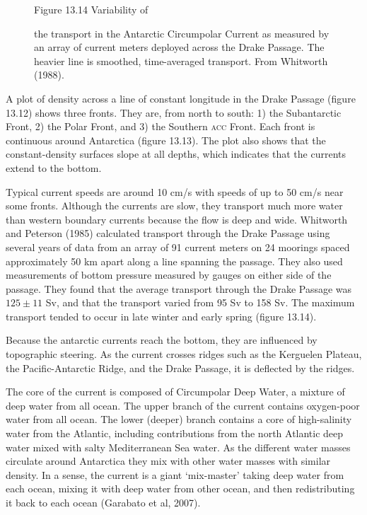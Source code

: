 \begin{figure}[b!] %
\vspace{-3ex}
\footnotesize
Figure 13.14 Variability of \rule{0mm}{5ex}the transport in the Antarctic Circumpolar Current as measured by an array of current meters deployed across the Drake Passage. The heavier line is smoothed, time-averaged transport. From Whitworth (1988).

\label{fig:aacxport}
\end{figure}

A plot of density across a line of constant longitude in the Drake Passage (figure 13.12) shows three fronts. They are, from north to south: 1) the Subantarctic Front, 2) the Polar Front, and 3) the Southern \textsc{acc} Front. Each front is continuous around Antarctica (figure 13.13). The plot also shows
that the constant-density surfaces slope at all depths, which indicates that the currents extend to the bottom.

Typical current speeds are around 10 cm/s with speeds of up to 50 cm/s near some fronts. Although the currents are slow, they transport much more water than western boundary currents because the flow is deep and wide. Whitworth and Peterson (1985) calculated transport through the Drake Passage using several years of data from an array of 91 current meters on 24 moorings spaced approximately 50 km apart along a line spanning the passage. They also used measurements of bottom pressure measured by gauges on either side of the passage. They found that the average transport through the Drake Passage was
$125 \pm 11$ Sv, and that the transport varied from 95 Sv to 158 Sv. The maximum transport tended to occur in late winter and early spring (figure 13.14).

Because the antarctic currents reach the bottom, they are influenced by topographic steering. As the current crosses ridges such as the Kerguelen Plateau, the Pacific-Antarctic Ridge, and the Drake Passage, it is deflected by the ridges.

The core of the current is composed of Circumpolar Deep Water, a mixture of deep water from all ocean. The upper branch of the
current contains oxygen-poor water from all ocean. The lower (deeper) branch
contains a core of high-salinity water from the Atlantic, including contributions
from the north Atlantic deep water mixed with salty Mediterranean Sea water. As the
different water masses circulate around Antarctica they mix with other water masses
with similar density. In a sense, the current is a giant `mix-master' taking deep
water from each ocean, mixing it with deep water from
other ocean, and then redistributing it back to each ocean (Garabato et al, 2007).

